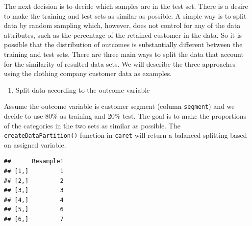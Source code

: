 \documentclass[
  12pt,
]{krantz}
\makeatletter
\newenvironment{Shaded}{\begin{snugshade}}{\end{snugshade}}
\newcommand{\AttributeTok}[1]{\textcolor[rgb]{0.61,0.61,0.61}{#1}}
\newcommand{\CommentTok}[1]{\textcolor[rgb]{0.37,0.37,0.37}{\textit{#1}}}
\newcommand{\ConstantTok}[1]{\textcolor[rgb]{0,0,0}{#1}}
\newcommand{\DecValTok}[1]{\textcolor[rgb]{0.06,0.06,0.06}{#1}}
\newcommand{\FloatTok}[1]{\textcolor[rgb]{0.06,0.06,0.06}{#1}}
\newcommand{\FunctionTok}[1]{\textcolor[rgb]{0,0,0}{#1}}
\newcommand{\NormalTok}[1]{#1}
\newcommand{\OtherTok}[1]{\textcolor[rgb]{0.37,0.37,0.37}{#1}}
\newcommand{\SpecialCharTok}[1]{\textcolor[rgb]{0,0,0}{#1}}
\newcommand{\StringTok}[1]{\textcolor[rgb]{0.5,0.5,0.5}{#1}}
\providecommand{\tightlist}{%
  \setlength{\itemsep}{0pt}\setlength{\parskip}{0pt}}
\newenvironment{kframe}{%
\medskip{}
\setlength{\fboxsep}{.8em}
 \def\at@end@of@kframe{}%
 \ifinner\ifhmode%
  \def\at@end@of@kframe{\end{minipage}}%
  \begin{minipage}{\columnwidth}%
 \fi\fi%
 \def\FrameCommand##1{\hskip\@totalleftmargin \hskip-\fboxsep
 \colorbox{shadecolor}{##1}\hskip-\fboxsep
     \hskip-\linewidth \hskip-\@totalleftmargin \hskip\columnwidth}%
 \MakeFramed {\advance\hsize-\width
   \@totalleftmargin\z@ \linewidth\hsize
   \@setminipage}}%
 {\par\unskip\endMakeFramed%
 \at@end@of@kframe}
\renewenvironment{Shaded}{\begin{kframe}}{\end{kframe}}
\makeatother
\begin{document}
The next decision is to decide which samples are in the test set. There is a desire to make the training and test sets as similar as possible. A simple way is to split data by random sampling which, however, does not control for any of the data attributes, such as the percentage of the retained customer in the data. So it is possible that the distribution of outcomes is substantially different between the training and test sets. There are three main ways to split the data that account for the similarity of resulted data sets. We will describe the three approaches using the clothing company customer data as examples.

\begin{enumerate}
\def\labelenumi{(\arabic{enumi})}
\tightlist
\item
  Split data according to the outcome variable
\end{enumerate}

Assume the outcome variable is customer segment (column \texttt{segment}) and we decide to use 80\% as training and 20\% test. The goal is to make the proportions of the categories in the two sets as similar as possible. The \texttt{createDataPartition()} function in \texttt{caret} will return a balanced splitting based on assigned variable.

\begin{Shaded}
\end{Shaded}

\begin{verbatim}
##      Resample1
## [1,]         1
## [2,]         2
## [3,]         3
## [4,]         4
## [5,]         6
## [6,]         7
\end{verbatim}
\end{document}
